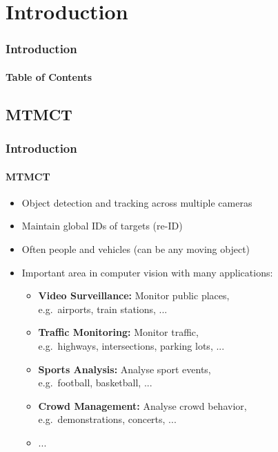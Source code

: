 \section{Introduction}
\begin{frame}
      \frametitle{Introduction}
      \framesubtitle{Table of Contents}
      {
            \hypersetup{hidelinks}
      }
\end{frame}

\subsection{MTMCT}
\begin{frame}
      \frametitle{Introduction}
      \framesubtitle{MTMCT}

      \begin{itemize}
            \item <1-> Object detection and tracking across multiple cameras
                  \vspace{5pt}
            \item <2-> Maintain global IDs of targets (re-ID)
                  \vspace{5pt}
            \item <3-> Often people and vehicles (can be any moving object)
                  \vspace{5pt}
            \item <4-> Important area in computer vision with many applications:
                  \begin{itemize}
                        \item <4-> \textbf{Video Surveillance:} Monitor public places,\\e.g.~airports, train stations, ...
                        \item <5-> \textbf{Traffic Monitoring:} Monitor traffic,\\e.g.~highways, intersections, parking lots, ...
                        \item <6-> \textbf{Sports Analysis:} Analyse sport events,\\e.g.~football, basketball, ...
                        \item <7-> \textbf{Crowd Management:} Analyse crowd behavior,\\e.g.~demonstrations, concerts, ...
                        \item <7-> ...
                  \end{itemize}
      \end{itemize}
\end{frame}

